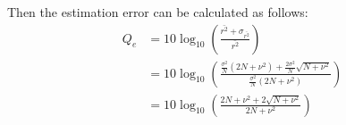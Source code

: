 Then the estimation error can be calculated as follows:
\begin{equation}
\begin{split}
    Q_e&=10 \log_{10}\left(\frac{\bar{r^2}+\sigma_{\bar{r^2}}}{\bar{r^2}}\right)\\
    &=10 \log_{10}\left(\frac{\frac{\sigma^2}{N}\left(2N+\nu^2\right)+\frac{2\sigma^2}{N}\sqrt{N+\nu^2}}{\frac{\sigma^2}{N}(2N+\nu^2)}\right)\\
    &=10 \log_{10}\left(\frac{2N+\nu^2+2\sqrt{N+\nu^2}}{2N+\nu^2}\right)
\end{split}
\label{app:Q_e}
\end{equation}
